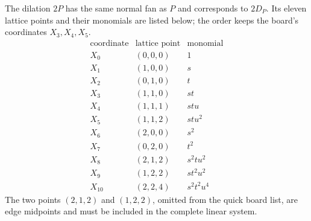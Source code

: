 \documentclass[11pt]{article}
\theoremstyle{definition}
\theoremstyle{remark}
\begin{document}
The dilation \(2P\) has the same normal fan as \(P\) and corresponds
to \(2D_P\). Its eleven lattice points and their monomials are listed
below; the order keeps the board's coordinates \(X_3,X_4,X_5\).
\[
    \begin{array}{c|c|c}
        \text{coordinate}&\text{lattice point}&\text{monomial}\\ \hline
        X_0&(0,0,0)&1\\
        X_1&(1,0,0)&s\\
        X_2&(0,1,0)&t\\
        X_3&(1,1,0)&st\\
        X_4&(1,1,1)&stu\\
        X_5&(1,1,2)&stu^2\\
        X_6&(2,0,0)&s^2\\
        X_7&(0,2,0)&t^2\\
        X_8&(2,1,2)&s^2tu^2\\
        X_9&(1,2,2)&st^2u^2\\
        X_{10}&(2,2,4)&s^2t^2u^4
    \end{array}
\]
The two points \((2,1,2)\) and \((1,2,2)\), omitted from the quick
board list, are edge midpoints and must be included in the complete
linear system.
\end{document}

